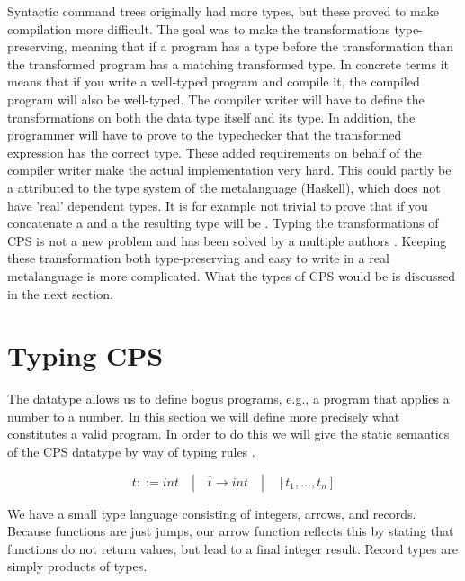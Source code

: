 Syntactic command trees originally had more types, but these proved to make compilation more difficult. The goal was to make the transformations type-preserving, meaning that if a program has a type before the transformation than the transformed program has a matching transformed type. In concrete terms it means that if you write a well-typed program and compile it, the compiled program will also be well-typed. The compiler writer will have to define the transformations on both the data type itself and its type. In addition, the programmer will have to prove to the typechecker that the transformed expression has the correct type. These added requirements on behalf of the compiler writer make the actual implementation very hard. This could partly be a attributed to the type system of the metalanguage (Haskell), which does not have 'real' dependent types. It is for example not trivial to prove that if you concatenate a  and a  the resulting type will be  \autocite{10.1145/2578854.2503786}. Typing the transformations of \ac{CPS} is not a new problem and has been solved by a multiple authors \autocite{DBLP:conf/popl/MorrisettWCG98, DBLP:conf/haskell/GuillemetteM07, DBLP:conf/pldi/Chlipala07}. Keeping these transformation both type-preserving and easy to write in a real metalanguage is more complicated. What the types of \ac{CPS} would be is discussed in the next section.

\section{\label{section:cpstype}Typing CPS}
The  datatype allows us to define bogus programs, e.g., a program that applies a number to a number. In this section we will define more precisely what constitutes a valid program. In order to do this we will give the static semantics of the \ac{CPS} datatype by way of typing rules \autocite{DBLP:conf/popl/MorrisettWCG98, DBLP:conf/pldi/Chlipala07}.

\begin{equation*}
t ::= int \quad | \quad \overline{t} \to int \quad | \quad [t_1, \dots, t_n]
\end{equation*}

We have a small type language consisting of integers, arrows, and records. Because functions are just jumps, our arrow function reflects this by stating that functions do not return values, but lead to a final integer result. Record types are simply products of types.

